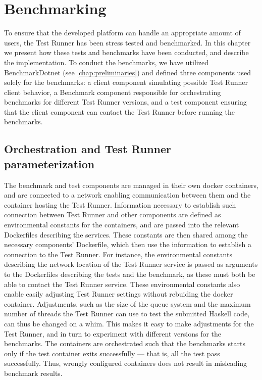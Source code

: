 \chapter{Benchmarking} \label{chap:Benchmarking}
To ensure that the developed platform can handle an appropriate amount of users, the Test Runner has been stress tested and benchmarked.
In this chapter we present how these tests and benchmarks have been conducted, and describe the implementation. To conduct the benchmarks, we have utilized BenchmarkDotnet (see \ref{chap:preliminaries}) and defined three components used solely for the benchmarks:
a client component simulating possible Test Runner client behavior, a Benchmark component responsible for orchestrating benchmarks for different Test Runner versions, and a test component ensuring that the client component can contact the Test Runner before running the benchmarks.

\section{Orchestration and Test Runner parameterization}
The benchmark and test components are managed in their own docker containers, and are connected to a network enabling communication between them and the container hosting the Test Runner. 
Information necessary to establish such connection between Test Runner and other components are defined as environmental constants for the containers, and are passed into the relevant Dockerfiles describing the services.
These constants are then shared among the necessary components' Dockerfile, which then use the information to establish a connection to the Test Runner.
For instance, the environmental constants describing the network location of the Test Runner service is passed as arguments to the Dockerfiles describing the tests and the benchmark, as these must both be able to contact the Test Runner service.
These environmental constants also enable easily adjusting Test Runner settings without rebuiding the docker container. Adjustments, such as the size of the queue system and the maximum number of threads the Test Runner can use to test the submitted Haskell code, can thus be changed on a whim. This makes it easy to make adjustments for the Test Runner, and in turn to experiment with different versions for the benchmarks.  
The containers are orchestrated such that the benchmarks starts only if the test container exits successfully --- that is, all the test pass successfully. Thus, wrongly configured containers does not result in misleading benchmark results.


